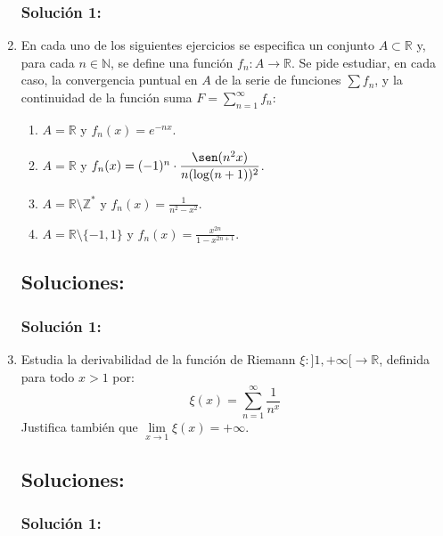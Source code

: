\documentclass[a4paper, 11pt]{article} %
\begin{document}
\begin{enumerate}
		\subsubsection*{Solución 1:}
	
	\item En cada uno de los siguientes ejercicios se especifica un conjunto $A \subset \mathbb{R}$ y,
	para cada $n \in \mathbb{N}$, se define una función $f_n: A \rightarrow \mathbb{R}$. Se pide estudiar,
	en cada caso, la convergencia puntual en $A$ de la serie de funciones $\sum f_n$, y la continuidad
	de la función suma $\displaystyle{F = \sum^{\infty}_{n = 1} f_n}$:
	\begin{enumerate}
		\item $A = \mathbb{R}$ y $f_n(x) = e^{-nx}$.
		\item $A = \mathbb{R}$ y $f_n(x) = (-1)^n \cdot \displaystyle{\frac{\sen (n^2x)}{n(\log(n+1))^2}}$.
		\item $A = \mathbb{R} \setminus \mathbb{Z}^*$ y $f_n(x) = \displaystyle{\frac{1}{n^2-x^2}}$.
		\item $A = \mathbb{R} \setminus \{-1,1\}$ y $f_n(x) = \displaystyle{\frac{x^{2n}}{1-x^{2n+1}}}$.
	\end{enumerate}
	\subsection*{Soluciones:}
		\subsubsection*{Solución 1:}
	
	\item Estudia la derivabilidad de la función de Riemann $\xi: ]1, +\infty[ \rightarrow \mathbb{R}$, definida
	para todo $x > 1$ por:
	$$\displaystyle{\xi(x) = \sum^{\infty}_{n=1} \frac{1}{n^x}}$$
	Justifica también que $\lim\limits_{x \rightarrow 1} \xi(x) = +\infty$.
	\subsection*{Soluciones:}
		\subsubsection*{Solución 1:}
\end{enumerate}
\end{document}
